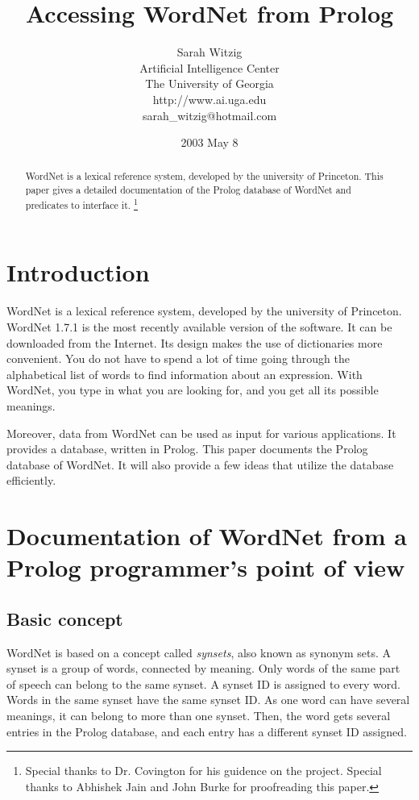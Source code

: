 \documentclass[12pt]{article}
\title{\bf Accessing WordNet from Prolog}
\author{Sarah Witzig\\
        Artificial Intelligence Center\\
        The University of Georgia \\
        http://www.ai.uga.edu\\
        sarah\_witzig@hotmail.com}
\date{2003 May 8}
\begin{document}
\maketitle

\begin{abstract}

WordNet is a lexical reference system, developed by the university of Princeton.
This paper gives a detailed documentation of the Prolog
database of WordNet and predicates to interface it. \footnote{Special thanks to Dr. Covington for his guidence on the project.
Special thanks to Abhishek Jain and John Burke for proofreading this paper.}

\end{abstract}

\section{Introduction}

WordNet is a lexical reference system, developed by the university of Princeton. WordNet 1.7.1 is the most recently
available version of the software. It can be downloaded from the Internet. Its design makes the use
of dictionaries more convenient. You do not have to spend a lot of time going through the alphabetical list of words
to find information about an expression. With WordNet, you type in what you are looking for, and you get all its possible meanings.

Moreover, data from WordNet can be used as input for various applications. It provides a database, written in Prolog.
This paper documents the Prolog database of WordNet. It will also provide a few ideas that utilize the database efficiently.

\section{Documentation of WordNet from a Prolog programmer's point of view}

\subsection{Basic concept}

WordNet is based on a concept called \emph{synsets}, also known as synonym sets. A synset is a group of words,
connected by meaning.
Only words of the same part of speech can belong to the same synset. A synset ID is assigned to every word.
Words in the same synset have the same synset ID.
As one word can have several meanings, it can belong to more
than one synset. Then, the word gets several entries in
the Prolog database, and each entry has a different synset ID assigned.
\end{document}
